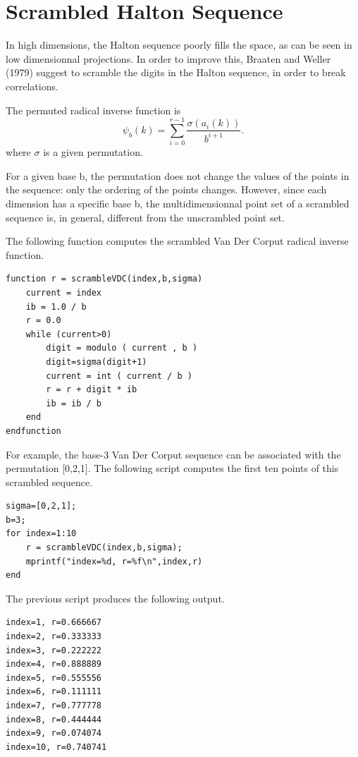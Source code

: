 \section{Scrambled Halton Sequence}

In high dimensions, the Halton sequence poorly
fills the space, as can be seen in low dimensionnal projections.
In order to improve this, Braaten and Weller (1979) suggest to scramble
the digits in the Halton sequence, in order to break correlations\cite{braaten1979}.

The permuted radical inverse function is
$$
  \psi_b(k)=\sum_{i=0}^{r-1} \frac{\sigma(a_{i}(k))}{b^{i+1}}.
$$
where $\sigma$ is a given permutation.

For a given base b, the permutation does not change the values
of the points in the sequence:
only the ordering of the points changes.
However, since each dimension has a specific base b, the
multidimensionnal point set of a scrambled sequence is, in general,
different from the unscrambled point set.

The following function computes the scrambled Van Der Corput
radical inverse function.

\lstset{language=scilabscript}
\begin{lstlisting}
function r = scrambleVDC(index,b,sigma)
    current = index
    ib = 1.0 / b
    r = 0.0
    while (current>0)
        digit = modulo ( current , b )
        digit=sigma(digit+1)
        current = int ( current / b )
        r = r + digit * ib
        ib = ib / b
    end
endfunction
\end{lstlisting}

For example, the base-3 Van Der Corput sequence can be associated
with the permutation [0,2,1].
The following script computes the first ten points of
this scrambled sequence.

\lstset{language=scilabscript}
\begin{lstlisting}
sigma=[0,2,1];
b=3;
for index=1:10
    r = scrambleVDC(index,b,sigma);
    mprintf("index=%d, r=%f\n",index,r)
end
\end{lstlisting}

The previous script produces the following output.

\lstset{language=scilabscript}
\begin{lstlisting}
index=1, r=0.666667
index=2, r=0.333333
index=3, r=0.222222
index=4, r=0.888889
index=5, r=0.555556
index=6, r=0.111111
index=7, r=0.777778
index=8, r=0.444444
index=9, r=0.074074
index=10, r=0.740741
\end{lstlisting}

